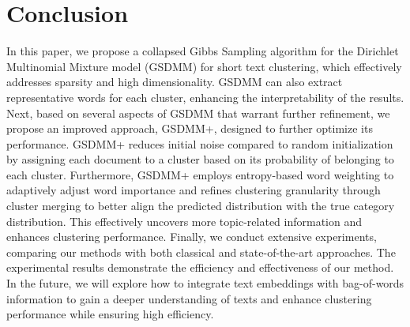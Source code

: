 \documentclass[lettersize,journal]{IEEEtran}
\newcommand{\sysname}{GSDMM+}
\begin{document}
\section{Conclusion} \label{sec:conclusion}
In this paper, we propose a collapsed Gibbs Sampling algorithm for the Dirichlet Multinomial Mixture model (GSDMM) for short text clustering, which effectively addresses sparsity and high dimensionality. GSDMM can also extract representative words for each cluster, enhancing the interpretability of the results. Next, based on several aspects of GSDMM that warrant further refinement, we propose an improved approach, \sysname{}, designed to further optimize its performance. \sysname{} reduces initial noise compared to random initialization by assigning each document to a cluster based on its probability of belonging to each cluster. Furthermore, \sysname{} employs entropy-based word weighting to adaptively adjust word importance and refines clustering granularity through cluster merging to better align the predicted distribution with the true category distribution. This effectively uncovers more topic-related information and enhances clustering performance.
Finally, we conduct extensive experiments, comparing our methods with both classical and state-of-the-art approaches. The experimental results demonstrate the efficiency and effectiveness of our method.
In the future, we will explore how to integrate text embeddings with bag-of-words information to gain a deeper understanding of texts and enhance clustering performance while ensuring high efficiency.





\end{document}
